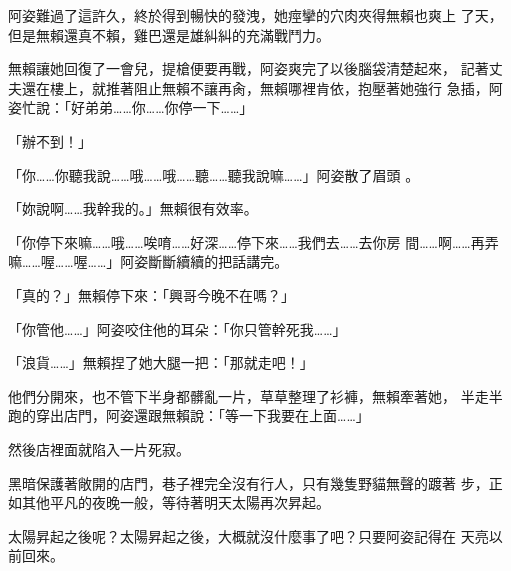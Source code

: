 阿姿難過了這許久，終於得到暢快的發洩，她痙攣的穴肉夾得無賴也爽上
了天，但是無賴還真不賴，雞巴還是雄糾糾的充滿戰鬥力。

無賴讓她回復了一會兒，提槍便要再戰，阿姿爽完了以後腦袋清楚起來，
記著丈夫還在樓上，就推著阻止無賴不讓再肏，無賴哪裡肯依，抱壓著她強行
急插，阿姿忙說：「好弟弟……你……你停一下……」

「辦不到！」

「你……你聽我說……哦……哦……聽……聽我說嘛……」阿姿散了眉頭
。

「妳說啊……我幹我的。」無賴很有效率。

「你停下來嘛……哦……唉唷……好深……停下來……我們去……去你房
間……啊……再弄嘛……喔……喔……」阿姿斷斷續續的把話講完。

「真的？」無賴停下來：「興哥今晚不在嗎？」

「你管他……」阿姿咬住他的耳朵：「你只管幹死我……」

「浪貨……」無賴捏了她大腿一把：「那就走吧！」

他們分開來，也不管下半身都髒亂一片，草草整理了衫褲，無賴牽著她，
半走半跑的穿出店門，阿姿還跟無賴說：「等一下我要在上面……」

然後店裡面就陷入一片死寂。

黑暗保護著敞開的店門，巷子裡完全沒有行人，只有幾隻野貓無聲的踱著
步，正如其他平凡的夜晚一般，等待著明天太陽再次昇起。

太陽昇起之後呢？太陽昇起之後，大概就沒什麼事了吧？只要阿姿記得在
天亮以前回來。











